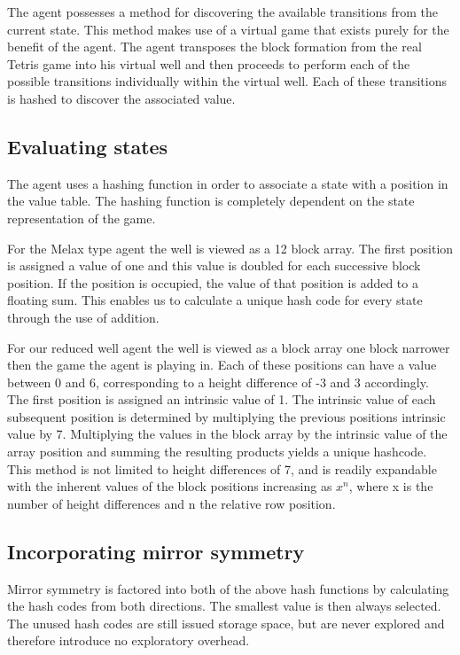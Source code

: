 \documentclass{rucsthesis}
\begin{document}
The agent possesses a method for discovering the available transitions from the current state. This method makes use of a virtual game that exists purely for the benefit of the agent. The agent transposes the block formation from the real Tetris game into his virtual well and then proceeds to perform each of the possible transitions individually within the virtual well. Each of these transitions is hashed to discover the associated value. 

\subsection{Evaluating states}

The agent uses a hashing function in order to associate a state with a position in the value table. The hashing function is completely dependent on the state representation of the game.

For the Melax type agent the well is viewed as a 12 block array. The first position is assigned a value of one and this value is doubled for each successive block position. If the position is occupied, the value of that position is added to a floating sum. This enables us to calculate a unique hash code for every state through the use of addition.

For our reduced well agent the well is viewed as a block array one block narrower then the game the agent is playing in. Each of these positions can have a value between 0 and 6, corresponding to a height difference of -3 and 3 accordingly. The first position is assigned an intrinsic value of 1. The intrinsic value of each subsequent position is determined by multiplying the previous positions intrinsic value by 7. Multiplying the values in the block array by the intrinsic value of the array position and summing the resulting products yields a unique hashcode. This method is not limited to height differences of 7, and is readily expandable with the inherent values of the block positions increasing as $x^n$, where x is the number of height differences and n the relative row position.

\subsection{Incorporating mirror symmetry}

Mirror symmetry is factored into both of the above hash functions by calculating the hash codes from both directions. The smallest value is then always selected. The unused hash codes are still issued storage space, but are never explored and therefore introduce no exploratory overhead.
\end{document}
